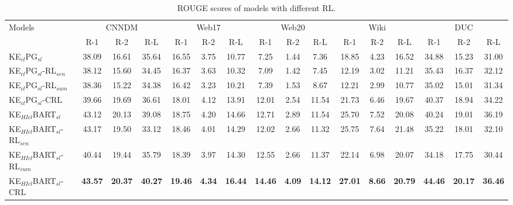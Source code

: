\begin{table*}[th!]
	\small
	\begin{center}
		\begin{tabular}{|l|c|c|c|c|c|c|c|c|c|c|c|c|c|c|c|}%
			\hline
			\multirow{2}{*}{Models}  &\multicolumn{3}{|c|}{CNNDM} & \multicolumn{3}{|c|}{Web17} & \multicolumn{3}{|c|}{Web20} & \multicolumn{3}{|c|}{Wiki} & \multicolumn{3}{|c|}{DUC}\\ 
			\cline{2-16}
			& R-1 & R-2 & R-L & R-1 & R-2 & R-L & R-1 & R-2 & R-L & R-1 & R-2 & R-L & R-1 & R-2 & R-L \\
			\hline 
			KE$_{cl}$PG$_{sl}$ & 38.09 & 16.61 & 35.64 & 16.55 & 3.75 & 10.77 & 7.25 & 1.44 & 7.36 & 18.85 & 4.23 & 16.52 & 34.88 & 15.23 & 31.00 \\
			KE$_{cl}$PG$_{sl}$-RL$_{sen}$ & 38.12 & 15.60 & 34.45 & 16.37 & 3.63 & 10.32 & 7.09 & 1.42 & 7.45 & 12.19 & 3.02 & 11.21 & 35.43 & 16.37 & 32.12\\
			KE$_{cl}$PG$_{sl}$-RL$_{sum}$ & 38.36 & 15.22 & 34.38 & 16.42 & 3.23 & 10.21 & 7.39 & 1.53 & 8.67 & 12.21 & 2.99 & 10.77 & 35.02 & 15.01 & 31.34 \\
			KE$_{cl}$PG$_{sl}$-CRL & 39.66 & 19.69 & 36.61 & 18.01 & 4.12 & 13.91 &  12.01 &2.54 &11.54 & 21.73 & 6.46 & 19.67 & 40.37 & 18.94 & 34.22 \\
			\hline
			KE$_{HIcl}$BART$_{sl}$ & 43.12 & 20.13 & 39.08  & 18.75& 4.20 &14.66 & 12.71 &2.89& 11.54 & 25.70 & 7.52 & 20.08 & 40.24 & 19.01 & 36.19\\
			KE$_{HIcl}$BART$_{sl}$-RL$_{sen}$ & 43.17 & 19.50 & 33.12 & 18.46 & 4.01 & 14.29 & 12.02 & 2.66 & 11.32 & 25.75 & 7.64 & 21.48 & 35.22 & 18.01 & 32.10\\
			KE$_{HIcl}$BART$_{sl}$-RL$_{sum}$ & 40.44 & 19.44 & 35.79 & 18.39 & 3.97 & 14.30 & 12.55 & 2.66 & 11.37 & 22.14 & 6.98 & 20.07 & 34.18 & 17.75 & 30.44 \\
			KE$_{HIcl}$BART$_{sl}$-CRL & \bf 43.57 & \bf 20.37 & \bf 40.27 & \bf 19.46& \bf 4.34& \bf 16.44 & \bf 14.46 & \bf 4.09 & \bf 14.12 & \bf 27.01 & \bf 8.66 & \bf 20.79 & \bf 44.46 &\bf 20.17 & \bf 36.46 \\
			\hline
		\end{tabular}
		\caption{\label{tab:rl} ROUGE scores of models with different RL.}
	\end{center}
\end{table*}


